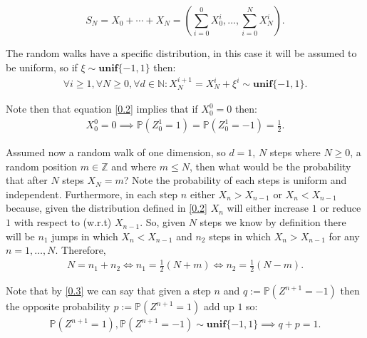\documentclass[12pt]{article}
\numberwithin{equation}{section}
\begin{document}
\begin{equation} \label{0.1}
    S_N = X_0 + \cdots + X_N =  \left(\sum^0_{i=0} X_0^i, 
 \dots , \sum^N_{i=0} X_N^i\right).
\end{equation}

The random walks have a specific distribution, in this case it will be assumed to be uniform, so if $\xi \sim \textbf{unif}\{-1, 1\}$ then:
\begin{equation} \label{0.2}
    \begin{split}
        \forall i \geq 1, \forall N \geq 0, \forall d \in \mathbb{N}:  X_N^{i+1} = X_N^i + \xi^i \sim \textbf{unif}\{-1, 1\}.
    \end{split}
\end{equation}

Note then that equation \ref{0.2} implies that if $X^0_0 = 0$ then:
\begin{equation} \label{0.3}
    \begin{split}
        X^0_0 = 0 \implies \mathbb{P}(Z_0^1 = 1) = \mathbb{P}(Z_0^1 = -1) = \frac{1}{2}.
    \end{split}
\end{equation}

Assumed now a random walk of one dimension, so $d = 1$, $N$ steps where $N \geq 0$, a random position $m \in \mathbb{Z}$ and where $m \leq N$, then what would be the probability that after $N$ steps $X_N = m$? Note the probability of each steps is uniform and independent. Furthermore, in each step $n$ either  $X_n > X_{n-1}$ or $X_{n} < X_{n-1}$ because, given the distribution defined in \ref{0.2} $X_n$ will either increase $1$ or reduce $1$ with respect to (w.r.t) $X_{n-1}$. So, given $N$ steps we know by definition there will be $n_1$ jumps in which $X_{n} < X_{n-1}$ and $n_2$ steps in which $X_{n} > X_{n-1}$ for any $n = 1, \dots, N$. Therefore, 
\begin{equation} \label{0.4}
    \begin{split}
        N = n_1 + n_2 \iff n_1 = \frac{1}{2} (N + m) \iff n_2 = \frac{1}{2} (N - m).
    \end{split}
\end{equation}

Note that by \ref{0.3} we can say that given a step $n$ and $q := \mathbb{P}(Z^{n+1} = -1)$ then the opposite probability $p := \mathbb{P}(Z^{n+1} = 1)$ add up $1$ so: 
\begin{equation} \label{0.4}
    \begin{split}
        \mathbb{P}(Z^{n+1} = 1) , \mathbb{P}(Z^{n+1} = -1) \sim \textbf{unif}\{-1, 1\} \implies q + p = 1.
    \end{split}
\end{equation}
\end{document}
